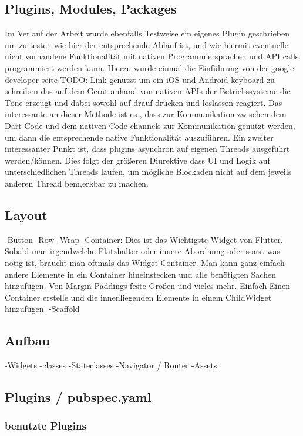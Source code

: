 \subsection{Plugins, Modules, Packages}
Im Verlauf der Arbeit wurde ebenfalls Testweise ein eigenes Plugin geschrieben um zu testen wie hier der entsprechende Ablauf ist, und wie hiermit eventuelle nicht vorhandene Funktionalität mit nativen Programmiersprachen und API calls programmiert werden kann. Hierzu wurde einmal die Einführung von der google developer seite TODO: Link genutzt um ein iOS und Android keyboard zu schreiben das auf dem Gerät anhand von nativen APIs der Betriebssysteme die Töne erzeugt und dabei sowohl auf drauf drücken und loslassen reagiert.
Das interessante an dieser Methode ist es , dass zur Kommunikation zwischen dem Dart Code und dem nativen Code channels zur Kommunikation genutzt werden, um dann die entsprechende native Funktionalität auszuführen. Ein zweiter interessanter Punkt ist, dass plugins asynchron auf eigenen Threads ausgeführt werden/können. Dies folgt der größeren Diurektive dass UI und Logik auf unterschiedlichen Threads laufen, um mögliche Blockaden nicht auf dem jeweils anderen Thread bem,erkbar zu machen.



\subsection{Layout}
-Button
-Row
-Wrap
-Container: Dies ist das Wichtigste Widget von Flutter. Sobald man irgendwelche Platzhalter oder innere Abordnung oder sonst was nötig ist, braucht man oftmals das Widget Container. Man kann ganz einfach andere Elemente in ein Container hineinstecken und alle benötigten Sachen hinzufügen. Von Margin Paddings feste Größen und vieles mehr. Einfach Einen Container erstelle und die innenliegenden Elemente in einem ChildWidget hinzufügen.
-Scaffold
\subsection{Aufbau}
-Widgets
-classes
-Stateclasses
-Navigator / Router
-Assets

\subsection{Plugins / pubspec.yaml}
\subsubsection{benutzte Plugins}
